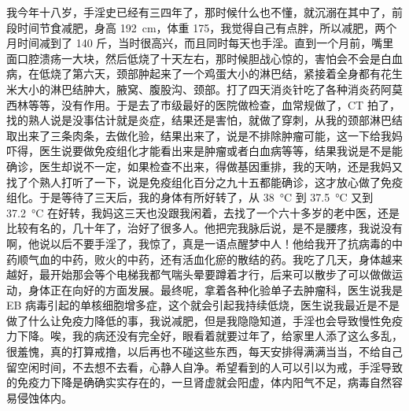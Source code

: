 \begin{case}
    我今年十八岁，手淫史已经有三四年了，那时候什么也不懂，就沉溺在其中了，前段时间节食减肥，身高 \SI{192}{\centi\metre}，体重 175，我觉得自己有点胖，所以减肥，两个月时间减到了 140 斤，当时很高兴，而且同时每天也手淫。直到一个月前，嘴里面口腔溃疡一大块，然后低烧了十天左右，那时候胆战心惊的，害怕会不会是白血病，在低烧了第六天，颈部肿起来了一个鸡蛋大小的淋巴结，紧接着全身都有花生米大小的淋巴结肿大，腋窝、腹股沟、颈部。打了四天消炎针吃了各种消炎药阿莫西林等等，没有作用。于是去了市级最好的医院做检查，血常规做了，CT 拍了，找的熟人说是没事估计就是炎症，结果还是害怕，就做了穿刺，从我的颈部淋巴结取出来了三条肉条，去做化验，结果出来了，说是不排除肿瘤可能，这一下给我妈吓得，医生说要做免疫组化才能看出来是肿瘤或者白血病等等，结果我说是不是能确诊，医生却说不一定，如果检查不出来，得做基因重排，我的天呐，还是我妈又找了个熟人打听了一下，说是免疫组化百分之九十五都能确诊，这才放心做了免疫组化。于是等待了三天后，我的身体有所好转了，从 \SI{38}{\degreeCelsius} 到 \SI{37.5}{\degreeCelsius} 又到 \SI{37.2}{\degreeCelsius} 在好转，我妈这三天也没跟我闲着，去找了一个六十多岁的老中医，还是比较有名的，几十年了，治好了很多人。他把完我脉后说，是不是腰疼，我说没有啊，他说以后不要手淫了，我惊了，真是一语点醒梦中人！他给我开了抗病毒的中药顺气血的中药，败火的中药，还有活血化瘀的散结的药。我吃了几天，身体越来越好，最开始那会等个电梯我都气喘头晕要蹲着才行，后来可以散步了可以做做运动，身体正在向好的方面发展。最终呢，拿着各种化验单子去肿瘤科，医生说我是 EB 病毒引起的单核细胞增多症，这个就会引起我持续低烧，医生说我最近是不是做了什么让免疫力降低的事，我说减肥，但是我隐隐知道，手淫也会导致慢性免疫力下降。唉，我的病还没有完全好，眼看着就要过年了，给家里人添了这么多乱，很羞愧，真的打算戒撸，以后再也不碰这些东西，每天安排得满满当当，不给自己留空闲时间，不去想不去看，心静人自净。希望看到的人可以引以为戒，手淫导致的免疫力下降是确确实实存在的，一旦肾虚就会阳虚，体内阳气不足，病毒自然容易侵蚀体内。

\end{case}
